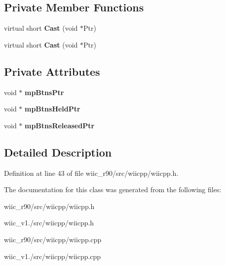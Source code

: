 \subsection*{Private Member Functions}
\begin{DoxyCompactItemize}
\item 
\hypertarget{class_c_button_base_aa2accc210e6c60b8d4aec8ea5ee4a9d8}{virtual short {\bfseries Cast} (void $\ast$Ptr)}\label{class_c_button_base_aa2accc210e6c60b8d4aec8ea5ee4a9d8}

\item 
\hypertarget{class_c_button_base_aa2accc210e6c60b8d4aec8ea5ee4a9d8}{virtual short {\bfseries Cast} (void $\ast$Ptr)}\label{class_c_button_base_aa2accc210e6c60b8d4aec8ea5ee4a9d8}

\end{DoxyCompactItemize}
\subsection*{Private Attributes}
\begin{DoxyCompactItemize}
\item 
\hypertarget{class_c_button_base_a92abce1aa79174a372f4a62bca66f124}{void $\ast$ {\bfseries mp\-Btns\-Ptr}}\label{class_c_button_base_a92abce1aa79174a372f4a62bca66f124}

\item 
\hypertarget{class_c_button_base_a22922c007bbfa3eafc96ce6b9c22de2c}{void $\ast$ {\bfseries mp\-Btns\-Held\-Ptr}}\label{class_c_button_base_a22922c007bbfa3eafc96ce6b9c22de2c}

\item 
\hypertarget{class_c_button_base_ae6fbf14254547bba855c08917e3e0b1b}{void $\ast$ {\bfseries mp\-Btns\-Released\-Ptr}}\label{class_c_button_base_ae6fbf14254547bba855c08917e3e0b1b}

\end{DoxyCompactItemize}


\subsection{Detailed Description}


Definition at line 43 of file wiic\-\_\-r90/src/wiicpp/wiicpp.\-h.



The documentation for this class was generated from the following files\-:\begin{DoxyCompactItemize}
\item 
wiic\-\_\-r90/src/wiicpp/wiicpp.\-h\item 
wiic\-\_\-v1./src/wiicpp/wiicpp.\-h\item 
wiic\-\_\-r90/src/wiicpp/wiicpp.\-cpp\item 
wiic\-\_\-v1./src/wiicpp/wiicpp.\-cpp\end{DoxyCompactItemize}

